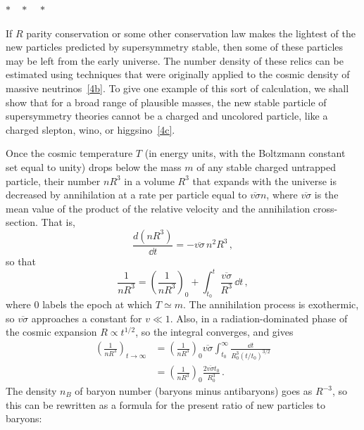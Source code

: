 \begin{center}
  \(*\quad *\quad *\)
\end{center}

If \(R\) parity conservation or some other conservation law makes the
lightest of the new particles predicted by supersymmetry stable, then
some of these particles may be left from the early universe. The number
density of these relics can be estimated using techniques that were
originally applied to the cosmic density of massive
neutrinos~\hyperref[ch28-ref-4b]{[4b]}. To give one example of this sort
of calculation, we shall show that for a broad range of plausible
masses, the new stable particle of supersymmetry theories cannot be a
charged and uncolored particle, like a charged slepton, wino, or
higgsino~\hyperref[ch28-ref-4c]{[4c]}.

Once the cosmic temperature \(T\) (in energy units, with the Boltzmann
constant set equal to unity) drops below the mass \(m\) of any stable
charged untrapped particle, their number \(nR^3\) in a volume \(R^3\)
that expands with the universe is decreased by annihilation at a rate
per particle equal to \(\overline{v\sigma}n\), where
\(\overline{v\sigma}\) is the mean value of the product of the relative
velocity and the annihilation cross-section. That is,
\[
  \frac{d(nR^3)}{\dd t}
  =-\overline{v\sigma}\,n^2R^3\,,
\]
so that
\begin{equation}
  \frac{1}{nR^3}
  =\left(\frac{1}{nR^3}\right)_0
  +\int_{t_0}^{t}\frac{\overline{v\sigma}}{R^3}\,\dd t\,,
  \tag{28.1.8}\label{eq:28.1.8}
\end{equation}
where 0 labels the epoch at which \(T\simeq m\). The annihilation
process is exothermic, so \(\overline{v\sigma}\) approaches a constant
for \(v\ll1\). Also, in a radiation-dominated phase of the cosmic
expansion \(R\propto t^{1/2}\), so the integral converges, and gives
\begin{equation}
  \begin{aligned}
  \left(\frac{1}{nR^3}\right)_{t\to\infty}
  &=
  \left(\frac{1}{nR^3}\right)_0
  \overline{v\sigma}
    \int_{t_0}^{\infty}\frac{\dd t}{R_0^3(t/t_0)^{3/2}}
  \\
  &=
  \left(\frac{1}{nR^3}\right)_0
  \frac{2\overline{v\sigma}t_0}{R_0^3}\,.
  \end{aligned}
  \tag{28.1.9}\label{eq:28.1.9}
\end{equation}
The density \(n_B\) of baryon number (baryons minus antibaryons) goes as
\(R^{-3}\), so this can be rewritten as a formula for the present ratio
of new particles to baryons:
